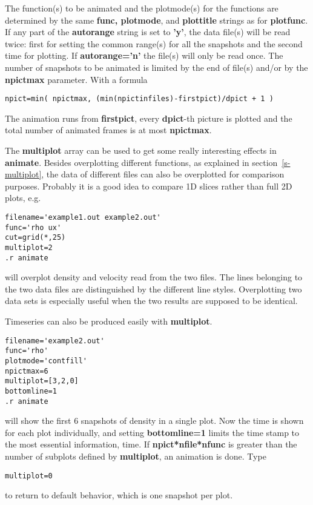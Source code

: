    The function(s) to be animated and the plotmode(s) for the functions 
   are determined by the same {\bf func, plotmode}, and {\bf plottitle} 
   strings as for {\bf plotfunc}. If any part of the 
   {\bf autorange} string is set to {\bf 'y'},
   the data file(s) will be read twice: first for setting the common range(s) 
   for all the snapshots and the second time for plotting.
   If {\bf autorange='n'} the file(s) will only be read once.
   The number of snapshots to be animated is limited by the end of 
   file(s) and/or by the {\bf npictmax} parameter. With a formula
\begin{verbatim}
npict=min( npictmax, (min(npictinfiles)-firstpict)/dpict + 1 )
\end{verbatim}
   The animation runs from {\bf firstpict}, every {\bf dpict}-th picture is
   plotted and the total number of animated frames is at most {\bf npictmax}. 

   The {\bf multiplot} array can be used to get some really interesting
   effects in {\bf animate}. Besides overplotting different functions,
   as explained in section~\ref{s-multiplot}, 
   the data of different files can also
   be overplotted for comparison purposes.
   Probably it is a good idea to compare 1D slices rather than full 2D plots,
   e.g. 
\begin{verbatim}
filename='example1.out example2.out'
func='rho ux'
cut=grid(*,25)
multiplot=2
.r animate
\end{verbatim}
   will overplot density and velocity read from the two files. 
   The lines belonging to the two data files are distinguished by
   the different line styles. Overplotting two data sets is
   especially useful when the two results are supposed to be identical.


   Timeseries can also be produced easily with {\bf multiplot}. 
\begin{verbatim}
filename='example2.out'
func='rho'
plotmode='contfill'
npictmax=6
multiplot=[3,2,0]
bottomline=1
.r animate
\end{verbatim}
   will show the first 6 snapshots of density in a single plot. 
   Now the time is shown for each plot individually, and setting
   {\bf bottomline=1} limits the time stamp to the most essential
   information, time. If {\bf npict*nfile*nfunc} is greater than the number 
   of subplots defined by {\bf multiplot}, an animation is done. 
   Type 
\begin{verbatim}
multiplot=0
\end{verbatim}
   to return to default behavior, which is one snapshot per plot.


